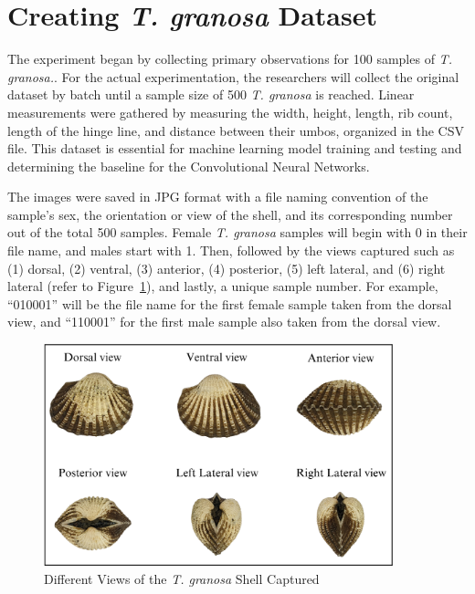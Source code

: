 \section{Creating \textit{T. granosa} Dataset}
\label{sec:dataset}

The experiment began by collecting primary observations for 100 samples of \textit{T. granosa.}. For the actual experimentation, the researchers will collect the original dataset by batch until a sample size of 500  \textit{T. granosa} is reached. Linear measurements were gathered by measuring the width, height, length, rib count, length of the hinge line, and distance between their umbos, organized in the CSV file. This dataset is essential for machine learning model training and testing and determining the baseline for the Convolutional Neural Networks. 


The images were saved in JPG format with a file naming convention of the sample’s sex, the orientation or view of the shell, and its corresponding number out of the total 500 samples. Female \textit{T. granosa} samples will begin with 0 in their file name, and males start with 1. Then, followed by the views captured such as (1) dorsal, (2) ventral, (3) anterior, (4) posterior, (5) left lateral, and (6) right lateral (refer to Figure~\ref{fig:granosa_views}), and lastly, a unique sample number. For example, “010001” will be the file name for the first female sample taken from the dorsal view, and “110001” for the first male sample also taken from the dorsal view. 



\begin{figure}[!htbp]
	\centering
	\includegraphics[width=0.9\textwidth]{figures/view.png}
	\caption{Different Views of the \textit{T. granosa} Shell Captured}
	\label{fig:granosa_views}
\end{figure}

